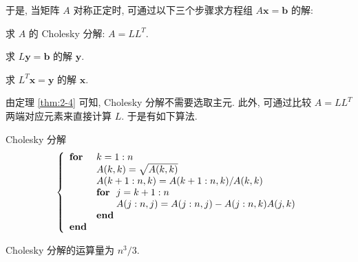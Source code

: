 于是, 当矩阵 $A$ 对称正定时, 可通过以下三个步骤求方程组 $A\mathbf{x}=\mathbf{b}$ 的解:

\begin{parenlist}
  \item 求 $A$ 的 Cholesky 分解: $A=LL^T$.
  \item 求 $L\mathbf{y}=\mathbf{b}$ 的解 $\mathbf{y}$.
  \item 求 $L^T\mathbf{x}=\mathbf{y}$ 的解 $\mathbf{x}$.
\end{parenlist}

由定理 \ref{thm:2-4} 可知, Cholesky 分解不需要选取主元. 此外, 可通过比较 $A=LL^T$ 两端对应元素来直接计算 $L$. 于是有如下算法.

\begin{algorithm}{Cholesky 分解}
  \label{alg:2-4}
\[
  \left\{
  \begin{array}{ll}
    \textbf{for} & k=1:n\\
    & A(k,k)=\sqrt{A(k,k)}\\
    & A(k+1:n,k)=A(k+1:n,k)/A(k,k)\\
    & \textbf{for}\ \ j=k+1:n\\
    & \hphantom{\textbf{for}\ \ }A(j:n,j)=A(j:n,j)-A(j:n,k)A(j,k)\\
    & \textbf{end}\\
    \textbf{end}
  \end{array}
  \right.
\]
\end{algorithm}

Cholesky 分解的运算量为 $n^3/3$.

